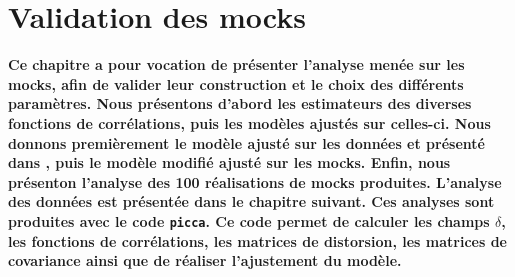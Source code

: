 \documentclass[11pt, twoside, a4paper, openright]{report}
\begin{document}

\graphicspath{ {../figures/mocks/} }

\chapter{Validation des mocks}
\minitoc
\newpage
\thispagestyle{fancy}


\textbf{Ce chapitre a pour vocation de présenter l'analyse menée sur les mocks, afin de valider leur construction et le choix des différents paramètres.
Nous présentons d'abord les estimateurs des diverses fonctions de corrélations, puis les modèles ajustés sur celles-ci.
Nous donnons premièrement le modèle ajusté sur les données et présenté dans \textcite{prov}, puis le modèle modifié ajusté sur les mocks.
Enfin, nous présenton l'analyse des 100 réalisations de mocks produites. L'analyse des données est présentée dans le chapitre suivant.
Ces analyses sont produites avec le code \texttt{picca}. Ce code permet de calculer les champs $\delta$, les fonctions de corrélations, les matrices de distorsion, les matrices de covariance ainsi que de réaliser l'ajustement du modèle.}
\end{document}
